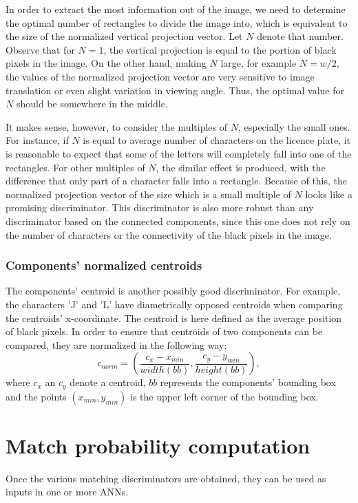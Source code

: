 \documentclass[times, utf8, zavrsni]{fer}
\begin{document}
In order to extract the most information out of the image, we need to determine
the optimal number of rectangles to divide the image into, which is equivalent
to the size of the normalized vertical projection vector. Let $N$ denote that
number. Observe that for $N = 1$, the vertical projection is equal to the
portion of black pixels in the image. On the other hand, making $N$ large, for
example $N = w / 2$, the values of the normalized projection vector are very
sensitive to image translation or even slight variation in viewing angle. Thus,
the optimal value for $N$ should be somewhere in the middle. 

It makes sense, however, to consider the multiples of $N$, especially the small
ones. For instance, if $N$ is equal to average number of characters on the
licence plate, it is reasonable to expect that some of the letters will
completely fall into one of the rectangles. For other multiples of $N$, the
similar effect is produced, with the difference that only part of a character
falls into a rectangle. Because of this, the normalized projection vector of the
size which is a small multiple of $N$ looks like a promising discriminator. This
discriminator is also more robust than any discriminator based on the connected
components, since this one does not rely on the number of characters or the
connectivity of the black pixels in the image.

\subsubsection{Components' normalized centroids}

The components' centroid is another possibly good discriminator. For example,
the characters 'J' and 'L' have diametrically opposed centroids when comparing
the centroids' x-coordinate. The centroid is here defined as the average
position of black pixels. In order to ensure that centroids of two components
can be compared, they are normalized in the following way:
\[ c_{norm} = (\frac{c_x - x_{min}}{width(bb)}, \frac{c_y -
y_{min}}{height(bb)}), \]
where $c_x$ an $c_y$ denote a centroid, $bb$ represents the components'
bounding box and the points $(x_{min}, y_{min})$ is the upper left corner of the
bounding box.

\section{Match probability computation}
Once the various matching discriminators are obtained, they can be used as
inputs in one or more ANNs. 
\end{document}
